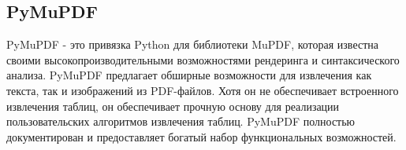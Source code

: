 \subsection{PyMuPDF}
PyMuPDF - это привязка Python для библиотеки MuPDF, которая известна своими высокопроизводительными возможностями рендеринга и синтаксического анализа. PyMuPDF предлагает обширные возможности для извлечения как текста, так и изображений из PDF-файлов. Хотя он не обеспечивает встроенного извлечения таблиц, он обеспечивает прочную основу для реализации пользовательских алгоритмов извлечения таблиц. PyMuPDF полностью документирован и предоставляет богатый набор функциональных возможностей.


